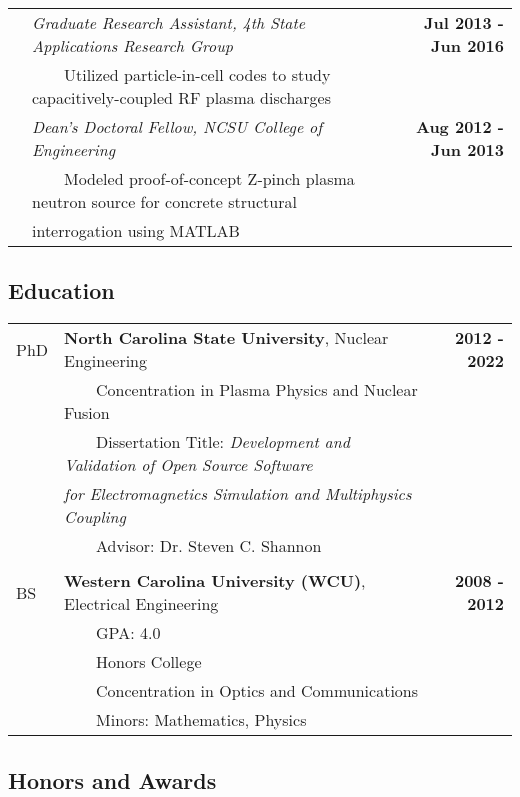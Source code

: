 \documentclass{article}
\newcommand{\tabitem}{~~\textbullet~~}
\begin{document}
\begin{tabularx}{\textwidth}{l X r}
	& \textit{Graduate Research Assistant, 4th State Applications Research Group} & \textbf{Jul 2013 - Jun 2016} \\
	& \tabitem Utilized particle-in-cell codes to study capacitively-coupled RF plasma discharges & \\
	& \textit{Dean's Doctoral Fellow, NCSU College of Engineering} & \textbf{Aug 2012 - Jun 2013} \\
	& \tabitem Modeled proof-of-concept Z-pinch plasma neutron source for concrete structural & \\
	& \hspace{1.5em} interrogation using MATLAB & \\
\end{tabularx}

\subsection*{Education}

	\begin{tabularx}{\textwidth}{l X r}
	PhD 	 & \textbf{North Carolina State University}, Nuclear Engineering & \textbf{2012 - 2022} \\
				 & \tabitem Concentration in Plasma Physics and Nuclear Fusion & \\
				 & \tabitem Dissertation Title: \textit{Development and Validation of Open Source Software} & \\
				 & \hspace{1.5em} \textit{for Electromagnetics Simulation and Multiphysics Coupling} & \\
				 & \tabitem Advisor: Dr. Steven C. Shannon & \\
         & & \\
	BS		 & \textbf{Western Carolina University (WCU)}, Electrical Engineering & \textbf{2008 - 2012} \\
				 & \tabitem GPA: 4.0 & \\
				 & \tabitem Honors College & \\
				 & \tabitem Concentration in Optics and Communications & \\
				 & \tabitem Minors: Mathematics, Physics & \\
	\end{tabularx}

\subsection*{Honors and Awards}
\end{document}
